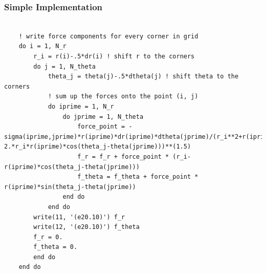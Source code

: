 \documentclass{beamer}
\begin{document}
\begin{frame}[fragile]
  \frametitle{Simple Implementation}
      
  \begin{lstlisting}
  
    ! write force components for every corner in grid
    do i = 1, N_r
        r_i = r(i)-.5*dr(i) ! shift r to the corners
        do j = 1, N_theta
            theta_j = theta(j)-.5*dtheta(j) ! shift theta to the corners
            ! sum up the forces onto the point (i, j)
            do iprime = 1, N_r
                do jprime = 1, N_theta
                    force_point = -sigma(iprime,jprime)*r(iprime)*dr(iprime)*dtheta(jprime)/(r_i**2+r(iprime)**2-2.*r_i*r(iprime)*cos(theta_j-theta(jprime)))**(1.5)
                    f_r = f_r + force_point * (r_i-r(iprime)*cos(theta_j-theta(jprime)))
                    f_theta = f_theta + force_point * r(iprime)*sin(theta_j-theta(jprime))
                end do
            end do
        write(11, '(e20.10)') f_r
        write(12, '(e20.10)') f_theta
        f_r = 0.
        f_theta = 0.
        end do
    end do
  \end{lstlisting}
\end{frame}
\end{document}
